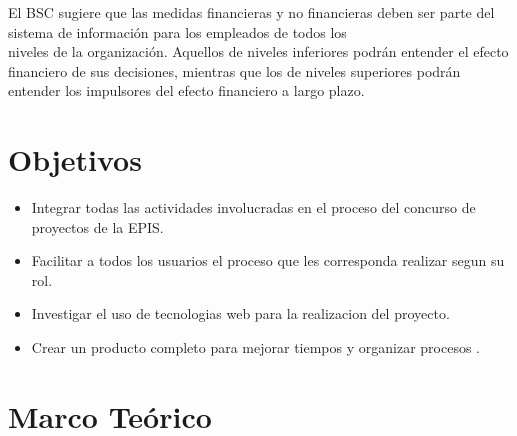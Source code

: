 \documentclass[%
 reprint,
 amsmath,amssymb,
 aps,
]{revtex4-1}
\begin{document}
El BSC sugiere que las medidas financieras y no financieras deben ser parte del sistema de información para los empleados de todos los\\
niveles de la organización. Aquellos de niveles inferiores podrán entender el efecto financiero de sus decisiones, mientras que los de niveles superiores podrán\\
entender los impulsores del efecto financiero a largo plazo.\\


\section {Objetivos}
\begin{itemize}
\item Integrar todas las actividades involucradas en el proceso del concurso de proyectos de la EPIS. \\
\item Facilitar a todos los usuarios el proceso que les corresponda realizar segun su rol. \\
\item Investigar el uso de tecnologias web para la realizacion del proyecto.  \\
\item Crear un producto completo para mejorar tiempos y organizar procesos .\\
\end{itemize}

\section {Marco Teórico}
\end{document}
